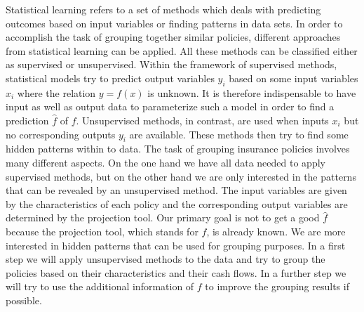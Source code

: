 Statistical learning refers to a set of methods which deals with predicting outcomes based on input variables or finding patterns in data sets. In order to accomplish the task of grouping together similar policies, different approaches from statistical learning can be applied. All these methods can be classified either as supervised or unsupervised. Within the framework of supervised methods, statistical models try to predict output variables $y_i$ based on some input variables $x_i$ where the relation $y=f(x)$ is unknown. It is therefore indispensable to have input as well as output data to parameterize such a model in order to find a prediction $\hat f$ of $f$. Unsupervised methods, in contrast, are used when inputs $x_i$ but no corresponding outputs $y_i$ are available. These methods then try to find some hidden patterns within to data. The task of grouping insurance policies involves many different aspects. On the one hand we have all data needed to apply supervised methods, but on the other hand we are only interested in the patterns that can be revealed by an unsupervised method. The input variables are given by the characteristics of each policy and the corresponding output variables are determined by the projection tool. Our primary goal is not to get a good $\hat f$ because the projection tool, which stands for $f$, is already known. We are more interested in hidden patterns that can be used for grouping purposes. In a first step we will apply unsupervised methods to the data and try to group the policies based on their characteristics and their cash flows. In a further step we will try to use the additional information of $f$ to improve the grouping results if possible. 

